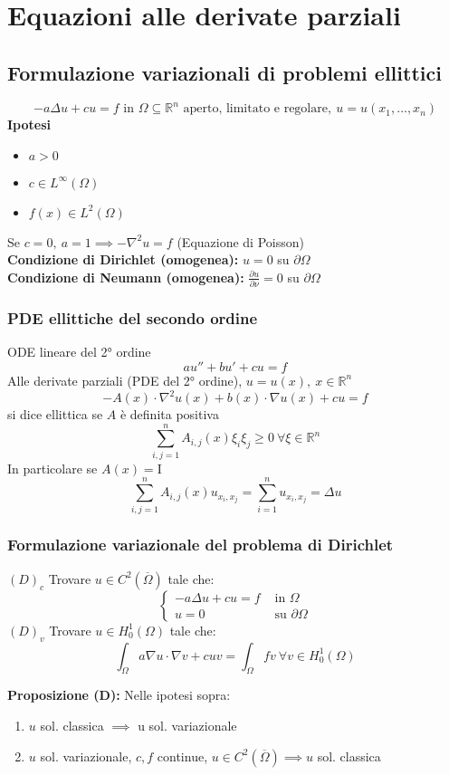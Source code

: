 \documentclass[a4paper]{article}
\newcommand{\R}{\mathbb{R}}
\begin{document}
\section{Equazioni alle derivate parziali}
\subsection{Formulazione variazionali di problemi ellittici}
\[-a\Delta u+cu=f\text{ in }\Omega\subseteq  \R^n\text{ aperto, limitato e regolare},\ u=u(x_1,\ldots,x_n)\]
\textbf{Ipotesi}
\begin{itemize}
	\item $a>0$ 
	\item $c\in L^{\infty}(\Omega)$ 
	\item $f(x)\in L^{2}(\Omega)$
\end{itemize}
Se $c=0,\ a=1\implies -\nabla ^2 u=f$ (Equazione di Poisson)\\
\textbf{Condizione di Dirichlet (omogenea):} $u=0$ su $\partial\Omega$
\\\textbf{Condizione di Neumann (omogenea):} $\frac{\partial u}{\partial \nu} =0$ su $\partial\Omega$
\subsubsection{PDE ellittiche del secondo ordine}
ODE lineare del 2° ordine
\[au''+bu'+cu=f\]
Alle derivate parziali (PDE del 2° ordine), $u=u(x),\ x\in \R^n$
\[-A(x)\cdot \nabla ^2 u(x)+b(x)\cdot \nabla u(x)+cu=f\]
si dice ellittica se $A$ è definita positiva
\[\sum_{i,j=1}^{n} A_{i,j}(x)\xi_i\xi_j\ge 0\ \forall \xi \in \R^n\]
In particolare se $A(x)=\text{I}$ 
\[\sum_{i,j=1}^{n} A_{i,j}(x)u_{x_i,x_j}=\sum_{i=1}^{n} u_{x_i,x_j}=\Delta u\]
\subsubsection{Formulazione variazionale del problema di Dirichlet}
$(D)_c$ Trovare $u\in C^2(\overline\Omega)$ tale che:
\[\begin{cases}
	-a\Delta u+cu=f&\text{ in }\Omega
	\\u=0&\text{ su }\partial \Omega
\end{cases}\]
$(D)_v$ Trovare $u\in H_0^1(\Omega)$ tale che:
\[\int_{\Omega}^{} a\nabla u\cdot \nabla v+cuv=\int_{\Omega}^{}fv \ \forall v\in H_0^1(\Omega)\]
\begin{tcolorbox}
	\textbf{Proposizione (D):} Nelle ipotesi sopra:
	\begin{enumerate}
		\item $u$ sol. classica $\implies $ u sol. variazionale
		\item $u$ sol. variazionale, $c,f$ continue, $u\in C^2(\overline\Omega)\implies u$ sol. classica
	\end{enumerate}
\end{tcolorbox}
\end{document}
